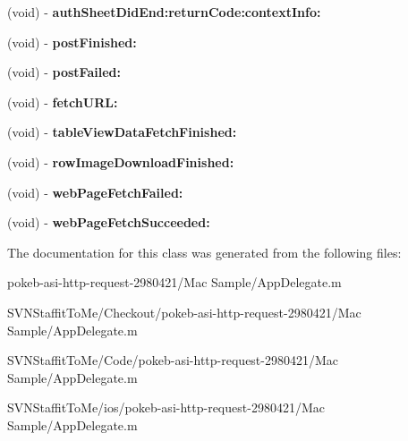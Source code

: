 \begin{DoxyCompactItemize}
\item 
\hypertarget{interface_app_delegate_07_08_a4105cf0e53153c648732d346a3d36a4f}{
(void) -\/ {\bfseries auth\-Sheet\-Did\-End\-:return\-Code\-:context\-Info\-:}}
\label{interface_app_delegate_07_08_a4105cf0e53153c648732d346a3d36a4f}

\item 
\hypertarget{interface_app_delegate_07_08_ac85d1ef9bdb254c0fe788fe536d6d5fe}{
(void) -\/ {\bfseries post\-Finished\-:}}
\label{interface_app_delegate_07_08_ac85d1ef9bdb254c0fe788fe536d6d5fe}

\item 
\hypertarget{interface_app_delegate_07_08_a75c2c2f337b6b7c499fd504bedc6cab8}{
(void) -\/ {\bfseries post\-Failed\-:}}
\label{interface_app_delegate_07_08_a75c2c2f337b6b7c499fd504bedc6cab8}

\item 
\hypertarget{interface_app_delegate_07_08_a4bf047dd192c26f94681048c15b2623f}{
(void) -\/ {\bfseries fetch\-U\-R\-L\-:}}
\label{interface_app_delegate_07_08_a4bf047dd192c26f94681048c15b2623f}

\item 
\hypertarget{interface_app_delegate_07_08_af9480a3ce0a0cb0f6c04e3cf9de252ea}{
(void) -\/ {\bfseries table\-View\-Data\-Fetch\-Finished\-:}}
\label{interface_app_delegate_07_08_af9480a3ce0a0cb0f6c04e3cf9de252ea}

\item 
\hypertarget{interface_app_delegate_07_08_ac7cd855f8dca00fb2f04edf71c42bfaa}{
(void) -\/ {\bfseries row\-Image\-Download\-Finished\-:}}
\label{interface_app_delegate_07_08_ac7cd855f8dca00fb2f04edf71c42bfaa}

\item 
\hypertarget{interface_app_delegate_07_08_a2359a2b308d2b5e78aa06bc7bf880b7c}{
(void) -\/ {\bfseries web\-Page\-Fetch\-Failed\-:}}
\label{interface_app_delegate_07_08_a2359a2b308d2b5e78aa06bc7bf880b7c}

\item 
\hypertarget{interface_app_delegate_07_08_a80920eddc398708c2cafa6a6fd6ee446}{
(void) -\/ {\bfseries web\-Page\-Fetch\-Succeeded\-:}}
\label{interface_app_delegate_07_08_a80920eddc398708c2cafa6a6fd6ee446}

\end{DoxyCompactItemize}


\-The documentation for this class was generated from the following files\-:\begin{DoxyCompactItemize}
\item 
pokeb-\/asi-\/http-\/request-\/2980421/\-Mac Sample/\-App\-Delegate.\-m\item 
\-S\-V\-N\-Staffit\-To\-Me/\-Checkout/pokeb-\/asi-\/http-\/request-\/2980421/\-Mac Sample/\-App\-Delegate.\-m\item 
\-S\-V\-N\-Staffit\-To\-Me/\-Code/pokeb-\/asi-\/http-\/request-\/2980421/\-Mac Sample/\-App\-Delegate.\-m\item 
\-S\-V\-N\-Staffit\-To\-Me/ios/pokeb-\/asi-\/http-\/request-\/2980421/\-Mac Sample/\-App\-Delegate.\-m\end{DoxyCompactItemize}
